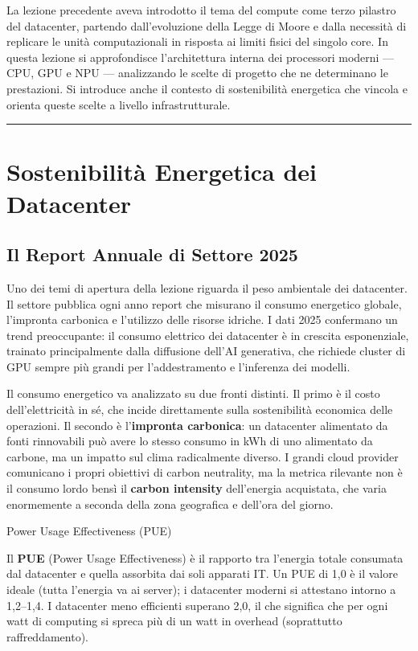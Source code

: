 \documentclass[
  italian,
  openany]{book}
\begin{document}
La lezione precedente aveva introdotto il tema del compute come terzo
pilastro del datacenter, partendo dall'evoluzione della Legge di Moore e
dalla necessità di replicare le unità computazionali in risposta ai
limiti fisici del singolo core. In questa lezione si approfondisce
l'architettura interna dei processori moderni --- CPU, GPU e NPU ---
analizzando le scelte di progetto che ne determinano le prestazioni. Si
introduce anche il contesto di sostenibilità energetica che vincola e
orienta queste scelte a livello infrastrutturale.

\begin{center}\rule{0.5\linewidth}{0.5pt}\end{center}

\section{Sostenibilità Energetica dei
Datacenter}\label{sostenibilituxe0-energetica-dei-datacenter}

\subsection{Il Report Annuale di Settore
2025}\label{il-report-annuale-di-settore-2025}

Uno dei temi di apertura della lezione riguarda il peso ambientale dei
datacenter. Il settore pubblica ogni anno report che misurano il consumo
energetico globale, l'impronta carbonica e l'utilizzo delle risorse
idriche. I dati 2025 confermano un trend preoccupante: il consumo
elettrico dei datacenter è in crescita esponenziale, trainato
principalmente dalla diffusione dell'AI generativa, che richiede cluster
di GPU sempre più grandi per l'addestramento e l'inferenza dei modelli.

Il consumo energetico va analizzato su due fronti distinti. Il primo è
il costo dell'elettricità in sé, che incide direttamente sulla
sostenibilità economica delle operazioni. Il secondo è
l'\textbf{impronta carbonica}: un datacenter alimentato da fonti
rinnovabili può avere lo stesso consumo in kWh di uno alimentato da
carbone, ma un impatto sul clima radicalmente diverso. I grandi cloud
provider comunicano i propri obiettivi di carbon neutrality, ma la
metrica rilevante non è il consumo lordo bensì il \textbf{carbon
intensity} dell'energia acquistata, che varia enormemente a seconda
della zona geografica e dell'ora del giorno.

\begin{calloutnote}{Power Usage Effectiveness (PUE)}

Il \textbf{PUE} (Power Usage Effectiveness) è il rapporto tra l'energia
totale consumata dal datacenter e quella assorbita dai soli apparati IT.
Un PUE di 1,0 è il valore ideale (tutta l'energia va ai server); i
datacenter moderni si attestano intorno a 1,2--1,4. I datacenter meno
efficienti superano 2,0, il che significa che per ogni watt di computing
si spreca più di un watt in overhead (soprattutto raffreddamento).

\end{calloutnote}
\end{document}

